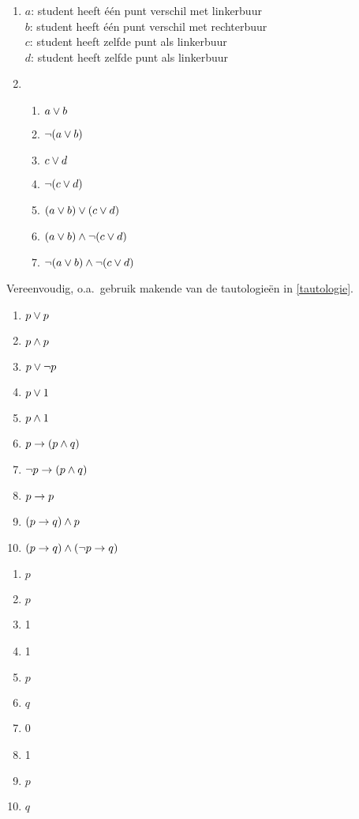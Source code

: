 \begin{oef}
\begin{opl}
\begin{enumerate}
\item
$a$: student heeft \'e\'en punt verschil met linkerbuur\\
$b$: student heeft \'e\'en punt verschil met rechterbuur\\
$c$: student heeft zelfde punt als linkerbuur\\
$d$: student heeft zelfde punt  als linkerbuur
\item \begin{enumerate}
\item $a \vee b$
\item $\neg (a \vee b)$
\item $c \vee d$
\item $\neg (c \vee d) $
\item $(a\vee b)\vee (c\vee d)$
\item $(a\vee b)\wedge \neg (c\vee d)$
\item $\neg (a\vee b)\wedge \neg (c\vee d)$
\end{enumerate}
\end{enumerate}
\end{opl}
\end{oef}

\begin{oef}
Vereenvoudig, o.a.\ gebruik makende van de tautologie\"en in \cref{tautologie}.
\begin{enumerate}
  \item $p \vee p$
  \item $p \wedge p$
  \item $p \vee \neg p$
  \item $p \vee 1$
  \item $p \wedge 1$
  \item $p \rightarrow (p \wedge q)$
  \item $\neg p \rightarrow (p \wedge q)$
  \item $p \rightarrow p$
  \item $(p \rightarrow q) \wedge p$
  \item $(p \rightarrow q) \wedge (\neg p \rightarrow q)$
\end{enumerate}
\begin{opl}
\begin{enumerate}
  \item $p$
  \item $p$
  \item 1
  \item 1
  \item $p$
  \item $q$
  \item 0
  \item 1
  \item $p$
  \item $q$
\end{enumerate}
\end{opl}
\end{oef}

